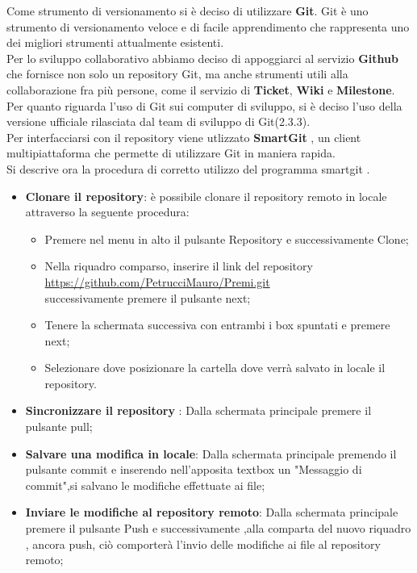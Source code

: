 Come strumento di versionamento si è deciso di utilizzare \textbf{Git}.
Git è uno strumento di versionamento veloce e di facile apprendimento che
rappresenta uno dei migliori strumenti attualmente esistenti.\\ Per lo sviluppo collaborativo abbiamo deciso di appoggiarci al servizio \textbf{Github} che fornisce non solo un repository Git, ma anche strumenti utili alla collaborazione fra più persone, come il servizio di \textbf{Ticket}, \textbf{Wiki} e \textbf{Milestone}.\\
Per quanto riguarda l’uso di Git sui computer di sviluppo, si è deciso l’uso
della versione ufficiale rilasciata dal team di sviluppo di Git(2.3.3).\\
Per interfacciarsi con il repository viene utlizzato \textbf{SmartGit} , un client multipiattaforma che permette di utilizzare Git in maniera rapida.\\
Si descrive ora la procedura di corretto utilizzo del programma smartgit .
\begin{itemize}

\item 	\textbf{Clonare il repository}: è possibile clonare il repository remoto in locale attraverso la seguente procedura:

\begin{itemize}
\item Premere nel menu in alto il pulsante Repository e successivamente Clone;
\item Nella riquadro comparso, inserire il link del repository\\ \url{https://github.com/PetrucciMauro/Premi.git}\\successivamente premere il pulsante  next;
\item Tenere la schermata successiva con entrambi i box spuntati e premere next;
\item Selezionare dove posizionare la cartella dove verrà salvato in locale il repository.
\end{itemize}
\item \textbf{Sincronizzare il repository} : Dalla schermata principale premere il pulsante pull; 
\item \textbf{Salvare una modifica in locale}: Dalla schermata principale premendo il pulsante commit e inserendo nell'apposita textbox un "Messaggio di commit",si salvano le modifiche effettuate ai file;
\item \textbf{Inviare le modifiche al repository remoto}: Dalla schermata principale premere il pulsante Push e successivamente ,alla comparta del nuovo riquadro , ancora push, ciò comporterà l'invio delle modifiche ai file al repository remoto;

\end{itemize}

